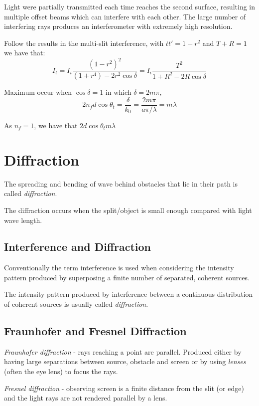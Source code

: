 \documentclass[UTF8]{book}
\begin{document}
Light were partially transmitted each time reaches the second surface, resulting in multiple offset beams which can interfere with each other. The large number of interfering rays produces an interferometer with extremely high resolution.

Follow the results in the multi-slit interference, with $tt'=1-r^2$ and $T+R=1$ we have that:
\[I_t=I_i\frac{(1-r^2)^2}{(1+r^4)-2r^2\cos \delta}=I_i\frac{T^2}{1+R^2-2R\cos \delta}\]

Maximum occur when $\cos \delta =1$ in which $\delta =2m\pi $,
\[2n_fd\cos \theta _t=\frac{\delta }{k_0}=\frac{2m\pi }{a\pi /\lambda}=m\lambda \]

As $n_f=1$, we have that $2d\cos \theta _tm\lambda $



\section{Diffraction}
The spreading and bending of wave behind obstacles that lie in their path is called \emph{diffraction}.

The diffraction occurs when the split/object is small enough compared with light wave length.
\subsection{Interference and Diffraction}
Conventionally the term interference is used when considering the intensity pattern produced by superposing a finite number of separated, coherent sources. 

The intensity pattern produced by interference between a continuous distribution of coherent sources is usually called \emph{diffraction}.



\subsection{Fraunhofer and Fresnel Diffraction}
\emph{Fraunhofer diffraction} - rays reaching a point are parallel. Produced either by having large separations between source, obstacle and screen or by using \emph{lenses} (often the eye lens) to focus the rays.

\emph{Fresnel diffraction} - observing screen is a finite distance from the slit (or edge) and the light rays are not rendered parallel by a lens.
\end{document}
